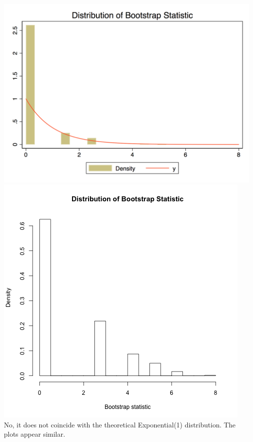 \documentclass[12pt]{article}
\begin{document}
\subsection{}
\includegraphics[totalheight=6cm]{hw3_Q3_1_stata.png}
\includegraphics[totalheight=6cm]{hw3_q3_2_r.png}\\

No, it does not coincide with the theoretical Exponential(1) distribution. The plots appear similar.
\end{document}
